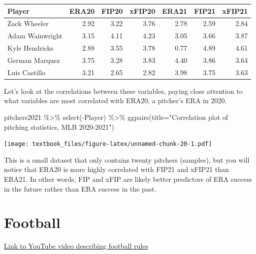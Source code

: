 \documentclass[
  11pt,
]{book}
\newenvironment{Shaded}{\begin{snugshade}}{\end{snugshade}}
\newcommand{\AttributeTok}[1]{\textcolor[rgb]{0.77,0.63,0.00}{#1}}
\newcommand{\FunctionTok}[1]{\textcolor[rgb]{0.00,0.00,0.00}{#1}}
\newcommand{\NormalTok}[1]{#1}
\newcommand{\SpecialCharTok}[1]{\textcolor[rgb]{0.00,0.00,0.00}{#1}}
\newcommand{\StringTok}[1]{\textcolor[rgb]{0.31,0.60,0.02}{#1}}
\theoremstyle{definition}
\theoremstyle{definition}
\theoremstyle{definition}
\theoremstyle{definition}
\theoremstyle{remark}
\begin{document}
\begin{table}[H]
\centering
\begin{tabular}{lrrrrrr}
\toprule
Player & ERA20 & FIP20 & xFIP20 & ERA21 & FIP21 & xFIP21\\
\midrule
Zack Wheeler & 2.92 & 3.22 & 3.76 & 2.78 & 2.59 & 2.84\\
Adam Wainwright & 3.15 & 4.11 & 4.23 & 3.05 & 3.66 & 3.87\\
Kyle Hendricks & 2.88 & 3.55 & 3.78 & 0.77 & 4.89 & 4.61\\
German Marquez & 3.75 & 3.28 & 3.83 & 4.40 & 3.86 & 3.64\\
Luis Castillo & 3.21 & 2.65 & 2.82 & 3.98 & 3.75 & 3.63\\
\bottomrule
\end{tabular}
\end{table}

\vfill
\newpage

Let's look at the correlations between these variables, paying close attention to what variables are most correlated with ERA20, a pitcher's ERA in 2020.

\begin{Shaded}
\begin{Highlighting}[]
\NormalTok{pitchers2021 }\SpecialCharTok{\%\textgreater{}\%}
  \FunctionTok{select}\NormalTok{(}\SpecialCharTok{{-}}\NormalTok{Player) }\SpecialCharTok{\%\textgreater{}\%}
  \FunctionTok{ggpairs}\NormalTok{(}\AttributeTok{title=}\StringTok{"Correlation plot of pitching statistics, MLB 2020{-}2021"}\NormalTok{)}
\end{Highlighting}
\end{Shaded}

\texttt{[image: textbook\_files/figure-latex/unnamed-chunk-20-1.pdf]}

This is a small dataset that only contains twenty pitchers (samples), but you will notice that ERA20 is more highly correlated with FIP21 and xFIP21 than ERA21. In other words, FIP and xFIP are likely better predictors of ERA success in the future rather than ERA success in the past.

\vfill
\newpage

\hypertarget{football}{%
\section{Football}\label{football}}

\href{https://www.youtube.com/watch?v=Ddwp1HyEFRE}{Link to YouTube video describing football rules}
\end{document}
